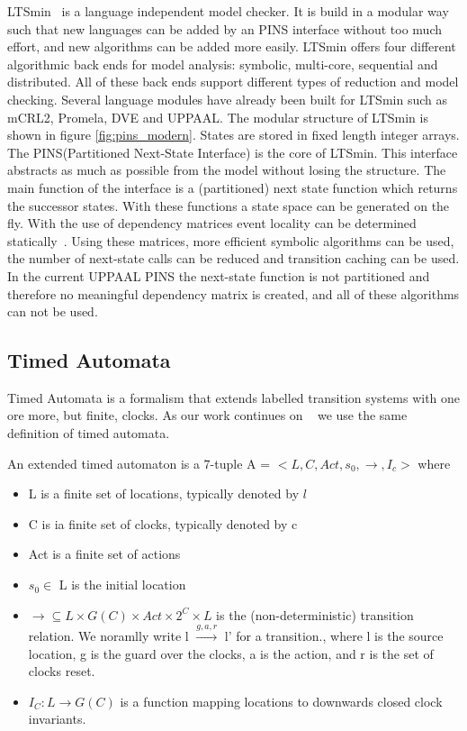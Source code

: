 \documentclass[11pt]{article}
\begin{document}
LTSmin~\cite{eemcs18152,ltsmin-mc:nmf2011} is a language independent model checker. It is build in a modular way such that new languages can be added by an PINS interface without too much effort, and new algorithms can be added more easily. LTSmin offers four different algorithmic back ends for model analysis: symbolic, multi-core, sequential and distributed. All of these back ends support different types of reduction and model checking. Several language modules have already been built for LTSmin such as mCRL2, Promela, DVE and UPPAAL. The modular structure of LTSmin is shown in figure \ref{fig:pins_modern}. States are stored in fixed length integer arrays. The PINS(Partitioned Next-State Interface) is the core of LTSmin. This interface abstracts as much as possible from the model without losing the structure. The main function of the interface is a (partitioned) next state function which returns the successor states. With these functions a state space can be generated on the fly. With the use of dependency matrices event locality can be determined statically~\cite{rwcmatrices}. Using these matrices, more efficient symbolic algorithms can be used, the number of next-state calls can be reduced and transition caching can be used. In the current UPPAAL PINS the next-state function is not partitioned and therefore no meaningful dependency matrix is created, and all of these algorithms can not be used.

\subsection{Timed Automata}
Timed Automata is a formalism that extends labelled transition systems with one ore more, but finite, clocks. As our work continues on ~\cite{eemcs21972} we use the same definition of timed automata.
\begin{mydef}
\label{def:TA}
An extended timed automaton is a 7-tuple A = $<L, C, Act, s_0, \rightarrow, I_c>$ where
{\renewcommand\labelitemi{--}
	\begin{itemize}
		\item L is a finite set of locations, typically denoted by $l$
		\item C is ia finite set of clocks, typically denoted by c
		\item Act is a finite set of actions
		\item $s_0 \in$ L is the initial location
		\item $\rightarrow \subseteq L \times G(C) \times Act \times 2^C \times L$ is the (non-deterministic) transition relation. We noramlly write l $\stackrel{g,a,r}{\longrightarrow}$ l' for a transition., where l is the source location, g is the guard over the clocks, a is the action, and r is the set of clocks reset.
		\item $I_C : L \rightarrow G(C)$ is a function mapping locations to downwards closed clock invariants.
	\end{itemize}
}
\end{mydef}
\end{document}
